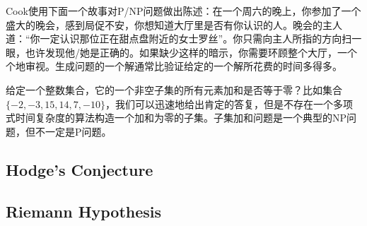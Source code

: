 Cook使用下面一个故事对P/NP问题做出陈述：在一个周六的晚上，你参加了一个盛大的晚会，感到局促不安，你想知道大厅里是否有你认识的人。晚会的主人道：“你一定认识那位正在甜点盘附近的女士罗丝”。你只需向主人所指的方向扫一眼，也许发现他/她是正确的。如果缺少这样的暗示，你需要环顾整个大厅，一个个地审视。生成问题的一个解通常比验证给定的一个解所花费的时间多得多。

给定一个整数集合，它的一个非空子集的所有元素加和是否等于零？比如集合$\{-2, -3, 15, 14, 7, -10\}$，我们可以迅速地给出肯定的答复，但是不存在一个多项式时间复杂度的算法构造一个加和为零的子集。子集加和问题是一个典型的NP问题，但不一定是P问题。

\subsection{Hodge's Conjecture}
\subsection{Riemann Hypothesis}
